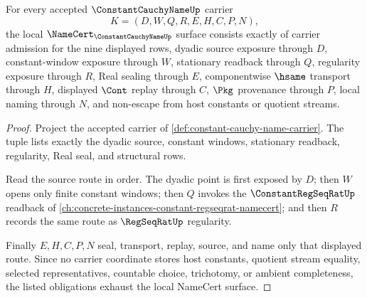 \begin{theorem}
\label{thm:constant-cauchy-name-namecert-obligations}
For every accepted $\ConstantCauchyNameUp$ carrier
$$
K=(D,W,Q,R,E,H,C,P,N),
$$
the local $\NameCert_{\ConstantCauchyNameUp}$ surface consists exactly of carrier admission for the nine displayed rows, dyadic source exposure through $D$, constant-window exposure through $W$, stationary readback through $Q$, regularity exposure through $R$, Real sealing through $E$, componentwise $\hsame$ transport through $H$, displayed $\Cont$ replay through $C$, $\Pkg$ provenance through $P$, local naming through $N$, and non-escape from host constants or quotient streams.
\end{theorem}
\begin{proof}
Project the accepted carrier of \autoref{def:constant-cauchy-name-carrier}. The tuple lists exactly the dyadic source, constant windows, stationary readback, regularity, Real seal, and structural rows.

Read the source route in order. The dyadic point is first exposed by $D$; then $W$ opens only finite constant windows; then $Q$ invokes the $\ConstantRegSeqRatUp$ readback of \autoref{ch:concrete-instances-constant-regseqrat-namecert}; and then $R$ records the same route as $\RegSeqRatUp$ regularity.

Finally $E,H,C,P,N$ seal, transport, replay, source, and name only that displayed route. Since no carrier coordinate stores host constants, quotient stream equality, selected representatives, countable choice, trichotomy, or ambient completeness, the listed obligations exhaust the local NameCert surface.
\end{proof}

